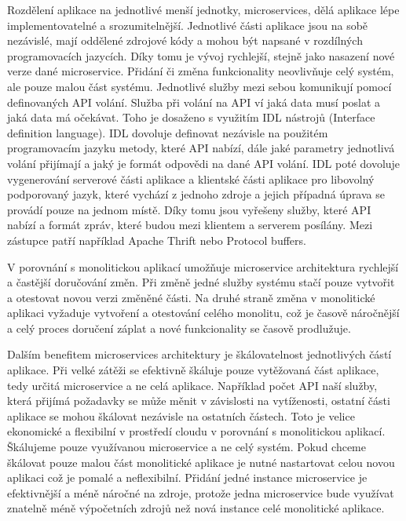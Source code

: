     Rozdělení aplikace na jednotlivé menší jednotky, microservices, dělá aplikace lépe implementovatelné a srozumitelnější. Jednotlivé části aplikace jsou na sobě nezávislé, mají oddělené zdrojové kódy a mohou být napsané v rozdílných programovacích jazycích. Díky tomu je vývoj rychlejší, stejně jako nasazení nové verze dané microservice. Přidání či změna funkcionality neovlivňuje celý systém, ale pouze malou část systému. Jednotlivé služby mezi sebou komunikují pomocí definovaných API volání. Služba při volání na API ví jaká data musí poslat a jaká data má očekávat. Toho je dosaženo s využitím IDL nástrojů (Interface definition language). IDL dovoluje definovat nezávisle na použitém programovacím jazyku metody, které API nabízí, dále jaké parametry jednotlivá volání přijímají a jaký je formát odpovědi na dané API volání. IDL poté dovoluje vygenerování serverové části aplikace a klientské části aplikace pro libovolný podporovaný jazyk, které vychází z jednoho zdroje a jejich případná úprava se provádí pouze na jednom místě. Díky tomu jsou vyřešeny služby, které API nabízí a formát zpráv, které budou mezi klientem a serverem posílány. Mezi zástupce patří například Apache Thrift \cite{sleethrift} nebo Protocol buffers. \par
    V porovnání s monolitickou aplikací umožňuje microservice architektura rychlejší a častější doručování změn. Při změně jedné služby systému stačí pouze vytvořit a otestovat novou verzi změněné části. Na druhé straně změna v monolitické aplikaci vyžaduje vytvoření a otestování celého monolitu, což je časově náročnější a celý proces doručení záplat a nové funkcionality se časově prodlužuje. \par
    Dalším benefitem microservices architektury je škálovatelnost jednotlivých částí aplikace. Při velké zátěži se efektivně škáluje pouze vytěžovaná část aplikace, tedy určitá microservice a ne celá aplikace. Například počet API naší služby, která přijímá požadavky se může měnit v závislosti na vytíženosti, ostatní části aplikace se mohou škálovat nezávisle na ostatních částech. Toto je velice ekonomické a flexibilní v prostředí cloudu v porovnání s monolitickou aplikací. Škálujeme pouze využívanou microservice a ne celý systém. Pokud chceme škálovat pouze malou část monolitické aplikace je nutné nastartovat celou novou aplikaci což je pomalé a neflexibilní. Přidání jedné instance microservice je efektivnější a méně náročné na zdroje, protože jedna microservice bude využívat znatelně méně výpočetních zdrojů než nová instance celé monolitické aplikace. \par
